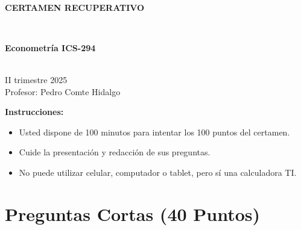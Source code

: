 \documentclass[10pt,a4paper]{article}
\begin{document}
\vspace{5cm}



\begin{center}
\begin{large}
\textbf{\\CERTAMEN RECUPERATIVO}
\end{large}\\
\end{center}

\begin{center}
\begin{large}
\textbf{Econometría ICS-294}
\end{large}\\
\vspace{0.2cm}
II trimestre 2025\\
Profesor: Pedro Comte Hidalgo
\end{center}

\textbf{Instrucciones:} 

\begin{itemize}

    \item Usted dispone de 100 minutos  para intentar los 100 puntos del certamen.
    \item Cuide la presentación y redacción de sus preguntas.
    \item No puede utilizar celular, computador o tablet, pero sí una calculadora TI.
     
\end{itemize}



\section{Preguntas Cortas (40 Puntos)}
\end{document}
